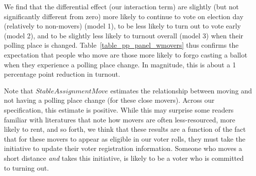 \documentclass{cup_PSRM}
\begin{document}
We find that the differential effect (our interaction term) are slightly (but not significantly different from zero) more likely to continue to vote on election day (relatively to non-movers) (model 1), to be less likely to turn out to vote early (model 2), and to be slightly less likely to turnout overall (model 3) when their polling place is changed.  Table~\ref{table_pp_panel_wmovers} thus confirms the expectation that people who move are those more likely to forgo casting a ballot when they experience a polling place change.  In magnitude, this is about a 1 percentage point reduction in turnout.

Note that $StableAssignmentMove$ estimates the relationship between moving and not having a polling place change (for these close movers).  Across our specification, this estimate is positive.  While this may surprise some readers familiar with literatures that note how movers are often less-resourced, more likely to rent, and so forth, we think that these results are a function of the fact that for these movers to appear as eligible in our voter rolls, they must take the initiative to update their voter registration information.  Someone who moves a short distance \emph{and} takes this initiative, is likely to be a voter who is committed to turning out.



\end{document}
